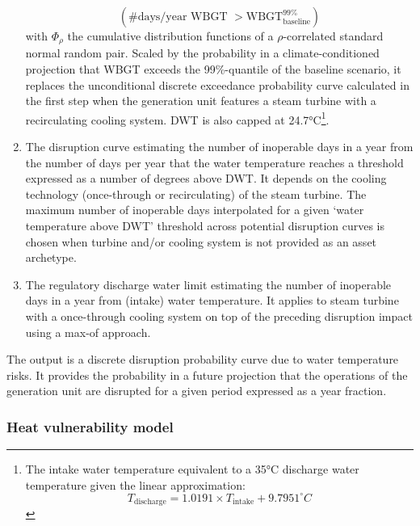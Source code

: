 \documentclass[a4paper,11pt]{extarticle} %
\theoremstyle{definition}
\begin{document}
\begin{enumerate}
$${\left(\text{\#days/year WBGT }> \text{WBGT}^{99\%}_{\text{baseline}}\right)}
$$
with $\Phi_{\rho}$ the cumulative distribution functions of a $\rho$-correlated standard normal random pair. Scaled by the probability in a climate-conditioned projection that WBGT exceeds the 99\%-quantile of the baseline scenario, it replaces the unconditional discrete exceedance probability curve calculated in the first step when the generation unit features a steam turbine with a recirculating cooling system. DWT is also capped at 24.7°C\footnote{The intake water temperature equivalent to a 35°C discharge water temperature given the linear approximation:
$$
T_{\text{discharge}}=1.0191\times T_{\text{intake}}+9.7951^{\circ}C
$$
}.
\item The disruption curve estimating the number of inoperable days in a year from the number of days per year that the water temperature reaches a threshold expressed as a number of degrees above DWT. It depends on the cooling technology (once-through or recirculating) of the steam turbine. The maximum number of inoperable days interpolated for a given `water temperature above DWT' threshold across potential disruption curves is chosen when turbine and/or cooling system is not provided as an asset archetype.
\item The regulatory discharge water limit estimating the number of inoperable days in a year from (intake) water temperature. It applies to steam turbine with a once-through cooling system on top of the preceding disruption impact using a max-of approach.
\end{enumerate}
The output is a discrete disruption probability curve due to water temperature risks. It provides the probability in a future projection that the operations of the generation unit are disrupted for a given period expressed as a year fraction.

\subsubsection{Heat vulnerability model}

\label{SubSec:HeatVulnerabilityModel}
\end{document}
